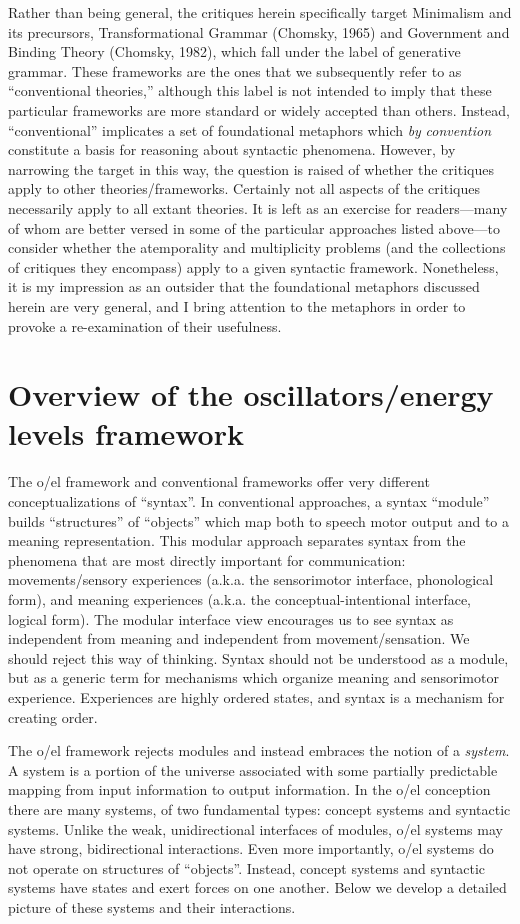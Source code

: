 Rather than being general, the critiques herein specifically target Minimalism and its precursors, Transformational Grammar (Chomsky, 1965) and Government and Binding Theory (Chomsky, 1982), which fall under the label of generative grammar. These frameworks are the ones that we subsequently refer to as “conventional theories,” although this label is not intended to imply that these particular frameworks are more standard or widely accepted than others. Instead, “conventional” implicates a set of foundational metaphors which \textit{by} \textit{convention} constitute a basis for reasoning about syntactic phenomena. However, by narrowing the target in this way, the question is raised of whether the critiques apply to other theories/frameworks. Certainly not all aspects of the critiques necessarily apply to all extant theories. It is left as an exercise for readers—many of whom are better versed in some of the particular approaches listed above—to consider whether the atemporality and multiplicity problems (and the collections of critiques they encompass) apply to a given syntactic framework. Nonetheless, it is my impression as an outsider that the foundational metaphors discussed herein are very general, and I bring attention to the metaphors in order to provoke a re-examination of their usefulness.

\chapter{Overview of the oscillators/energy levels framework}
The o/el framework and conventional frameworks offer very different conceptualizations of “syntax”. In conventional approaches, a syntax “module” builds “structures” of “objects” which map both to speech motor output and to a meaning representation. This modular approach separates syntax from the phenomena that are most directly important for communication: movements/sensory experiences (a.k.a. the sensorimotor interface, phonological form), and meaning experiences (a.k.a. the conceptual-intentional interface, logical form). The modular interface view encourages us to see syntax as independent from meaning and independent from movement/sensation. We should reject this way of thinking. Syntax should not be understood as a module, but as a generic term for mechanisms which organize meaning and sensorimotor experience. Experiences are highly ordered states, and syntax is a mechanism for creating order. 

  The o/el framework rejects modules and instead embraces the notion of a \textit{system}. A system is a portion of the universe associated with some partially predictable mapping from input information to output information. In the o/el conception there are many systems, of two fundamental types: concept systems and syntactic systems. Unlike the weak, unidirectional interfaces of modules, o/el systems may have strong, bidirectional interactions. Even more importantly, o/el systems do not operate on structures of “objects”. Instead, concept systems and syntactic systems have states and exert forces on one another. Below we develop a detailed picture of these systems and their interactions. 

